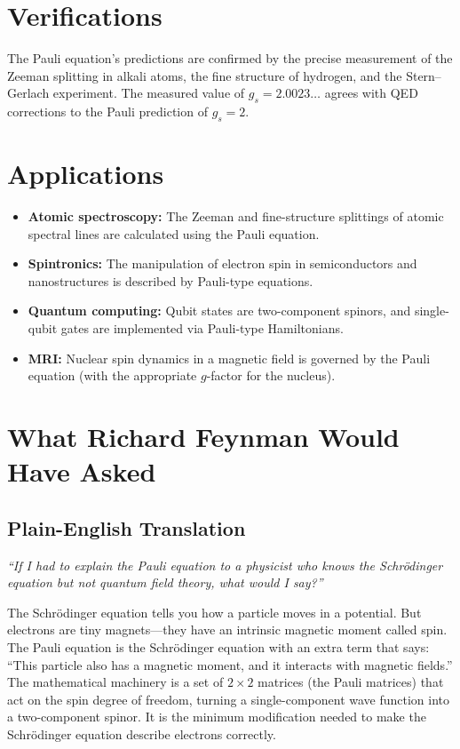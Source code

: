\section*{Verifications}

The Pauli equation's predictions are confirmed by the precise measurement of the Zeeman splitting in alkali atoms, the fine structure of hydrogen, and the Stern--Gerlach experiment. The measured value of $g_{s} = 2.0023\ldots$ agrees with QED corrections to the Pauli prediction of $g_{s} = 2$.
\section*{Applications}

\begin{itemize}
  \item \textbf{Atomic spectroscopy:} The Zeeman and fine-structure splittings of atomic spectral lines are calculated using the Pauli equation.
  \item \textbf{Spintronics:} The manipulation of electron spin in semiconductors and nanostructures is described by Pauli-type equations.
  \item \textbf{Quantum computing:} Qubit states are two-component spinors, and single-qubit gates are implemented via Pauli-type Hamiltonians.
  \item \textbf{MRI:} Nuclear spin dynamics in a magnetic field is governed by the Pauli equation (with the appropriate $g$-factor for the nucleus).
\end{itemize}
\section*{What Richard Feynman Would Have Asked}

\subsection*{Plain-English Translation}
\textit{``If I had to explain the Pauli equation to a physicist who knows the Schrödinger equation but not quantum field theory, what would I say?''}

The Schrödinger equation tells you how a particle moves in a potential. But electrons are tiny magnets---they have an intrinsic magnetic moment called spin. The Pauli equation is the Schrödinger equation with an extra term that says: ``This particle also has a magnetic moment, and it interacts with magnetic fields.'' The mathematical machinery is a set of $2 \times 2$ matrices (the Pauli matrices) that act on the spin degree of freedom, turning a single-component wave function into a two-component spinor. It is the minimum modification needed to make the Schrödinger equation describe electrons correctly.

